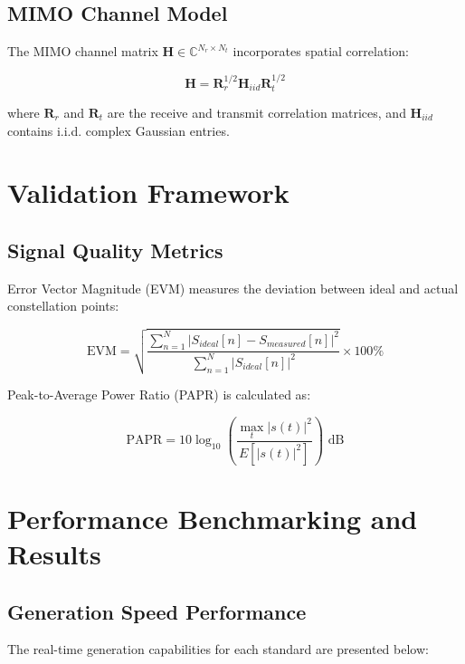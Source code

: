 \documentclass[twocolumn,10pt]{article}
\begin{document}
\subsection{MIMO Channel Model}

The MIMO channel matrix $\mathbf{H} \in \mathbb{C}^{N_r \times N_t}$ incorporates spatial correlation:

\begin{equation}
\mathbf{H} = \mathbf{R}_r^{1/2} \mathbf{H}_{iid} \mathbf{R}_t^{1/2}
\end{equation}

where $\mathbf{R}_r$ and $\mathbf{R}_t$ are the receive and transmit correlation matrices, and $\mathbf{H}_{iid}$ contains i.i.d. complex Gaussian entries.

\section{Validation Framework}

\subsection{Signal Quality Metrics}

Error Vector Magnitude (EVM) measures the deviation between ideal and actual constellation points:

\begin{equation}
\text{EVM} = \sqrt{\frac{\sum_{n=1}^{N} |S_{ideal}[n] - S_{measured}[n]|^2}{\sum_{n=1}^{N} |S_{ideal}[n]|^2}} \times 100\%
\end{equation}

Peak-to-Average Power Ratio (PAPR) is calculated as:

\begin{equation}
\text{PAPR} = 10\log_{10}\left(\frac{\max_{t}|s(t)|^2}{E[|s(t)|^2]}\right) \text{ dB}
\end{equation}

\section{Performance Benchmarking and Results}

\subsection{Generation Speed Performance}

The real-time generation capabilities for each standard are presented below:
\end{document}
